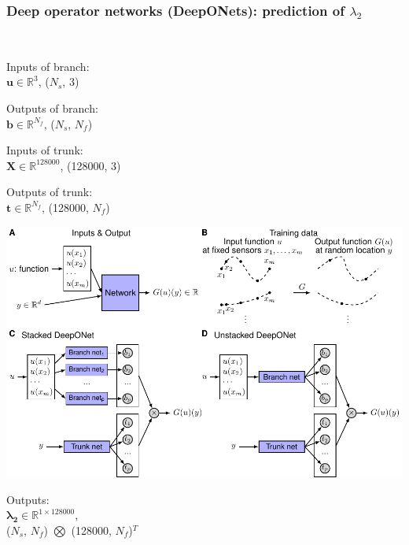 \documentclass[aspectratio=169]{beamer}
\begin{document}
\begin{frame}
  \frametitle{Deep operator networks (DeepONets): prediction of $\lambda_2$}\
  
\begin{minipage}{0.30\textwidth}
    Inputs of branch: \\$\mathbf{u} \in \mathbb{R}^3$, ($N_s$, 3)

    Outputs of branch: \\$\boldsymbol{b} \in \mathbb{R}^{N_f}$, ($N_s$, $N_f$)

    \vspace{\baselineskip}

    Inputs of trunk: \\$\mathbf{X} \in \mathbb{R}^{128000}$, (128000, 3)

    Outputs of trunk: \\$\boldsymbol{t} \in \mathbb{R}^{N_f}$, (128000, $N_f$)
\end{minipage}
\begin{minipage}{0.30\textwidth}
    \includegraphics[width=\textwidth, trim={10.05cm 0cm 0cm 4.8cm}, clip]{deeponet.pdf}
\end{minipage}
\begin{minipage}{0.35\textwidth}

  Outputs: \\$\boldsymbol{\lambda_{2}} \in \mathbb{R}^{1\times128000}$, \\($N_s$, $N_f$) $\bigotimes$ (128000, $N_f$)$^{T}$

\end{minipage}
\end{frame}

\end{document}
